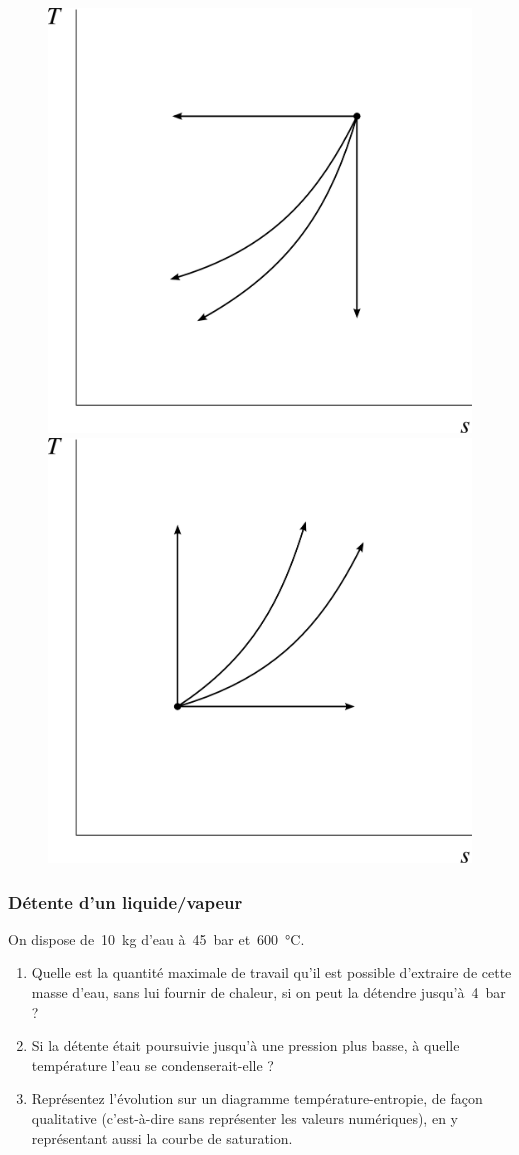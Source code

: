 	\begin{figure}[htp] %
		\begin{center}
			\includegraphics[width=0.6\columnwidth]{images/exo_ts_elementaires1.png}
			\includegraphics[width=0.6\columnwidth]{images/exo_ts_elementaires2.png}
		\end{center}
		\label{fig_tsel}
	\end{figure}


\subsubsection{Détente d’un liquide/vapeur}
\label{exo_detente_liquide_vapeur}

	On dispose de~\SI{10}{\kilogram} d’eau à~\SI{45}{\bar} et~\SI{600}{\degreeCelsius}.
	
	\begin{enumerate}
		\item Quelle est la quantité maximale de travail qu’il est possible d’extraire de cette masse d’eau, sans lui fournir de chaleur, si on peut la détendre jusqu’à~\SI{4}{\bar} ?
		\item Si la détente était poursuivie jusqu’à une pression plus basse, à quelle température l’eau se condenserait-elle ?
		\item Représentez l’évolution sur un diagramme température-entropie, de façon qualitative (c’est-à-dire sans représenter les valeurs numériques), en y représentant aussi la courbe de saturation.
	\end{enumerate}


